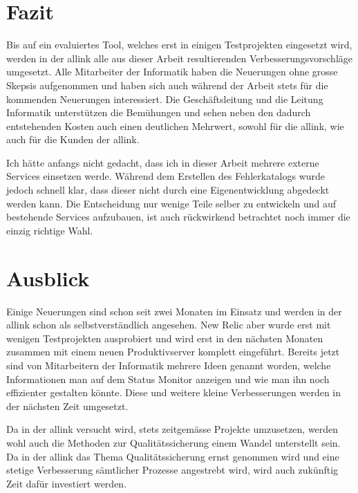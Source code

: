
\section{Fazit}
\label{sec:fazit}
Bis auf ein evaluiertes Tool, welches erst in einigen Testprojekten eingesetzt wird, werden in der allink alle aus dieser Arbeit resultierenden Verbesserungsvorschläge umgesetzt. Alle Mitarbeiter der Informatik haben die Neuerungen ohne grosse Skepsis aufgenommen und haben sich auch während der Arbeit stets für die kommenden Neuerungen interessiert. Die Geschäftsleitung und die Leitung Informatik unterstützen die Bemühungen und sehen neben den dadurch entstehenden Kosten auch einen deutlichen Mehrwert, sowohl für die allink, wie auch für die Kunden der allink.

Ich hätte anfangs nicht gedacht, dass ich in dieser Arbeit mehrere externe Services einsetzen werde. Während dem Erstellen des Fehlerkatalogs wurde jedoch schnell klar, dass dieser nicht durch eine Eigenentwicklung abgedeckt werden kann. Die Entscheidung nur wenige Teile selber zu entwickeln und auf bestehende Services aufzubauen, ist auch rückwirkend betrachtet noch immer die einzig richtige Wahl.

\section{Ausblick}
\label{sec:ausblick}
Einige Neuerungen sind schon seit zwei Monaten im Einsatz und werden in der allink schon als selbstverständlich angesehen. New Relic aber wurde erst mit wenigen Testprojekten ausprobiert und wird erst in den nächsten Monaten zusammen mit einem neuen Produktivserver komplett eingeführt. Bereits jetzt sind von Mitarbeitern der Informatik mehrere Ideen genannt worden, welche Informationen man auf dem Status Monitor anzeigen und wie man ihn noch effizienter gestalten könnte. Diese und weitere kleine Verbesserungen werden in der nächsten Zeit umgesetzt.

Da in der allink versucht wird, stets zeitgemässe Projekte umzusetzen, werden wohl auch die Methoden zur Qualitätssicherung einem Wandel unterstellt sein. Da in der allink das Thema Qualitätssicherung ernst genommen wird und eine stetige Verbesserung sämtlicher Prozesse angestrebt wird, wird auch zukünftig Zeit dafür investiert werden.

